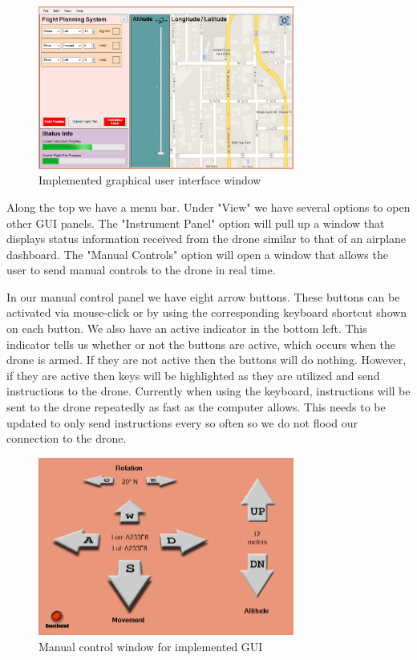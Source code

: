 \documentclass[12pt,a4paper]{article}
\begin{document}
	\begin{figure}[h!]
		\centering
		\includegraphics[width=0.75\textwidth]{guiWindow.png}
		\caption{Implemented graphical user interface window}
	\end{figure}

Along the top we have a menu bar.  Under "View" we have several options to open other GUI panels.  The "Instrument Panel" option will pull up a window that displays status information received from the drone similar to that of an airplane dashboard.  The "Manual Controls" option will open a window that allows the user to send manual controls to the drone in real time.

In our manual control panel we have eight arrow buttons.  These buttons can be activated via mouse-click or by using the corresponding keyboard shortcut shown on each button.  We also have an active indicator in the bottom left.  This indicator tells us whether or not the buttons are active, which occurs when the drone is armed.  If they are not active then the buttons will do nothing.  However, if they are active then keys will be highlighted as they are utilized and send instructions to the drone.  Currently when using the keyboard, instructions will be sent to the drone repeatedly as fast as the computer allows.  This needs to be updated to only send instructions every so often so we do not flood our connection to the drone.

	\begin{figure}[h!]
		\centering
		\includegraphics[width=0.75\textwidth]{MCWindow.png}
		\caption{Manual control window for implemented GUI}
	\end{figure}
\end{document}
